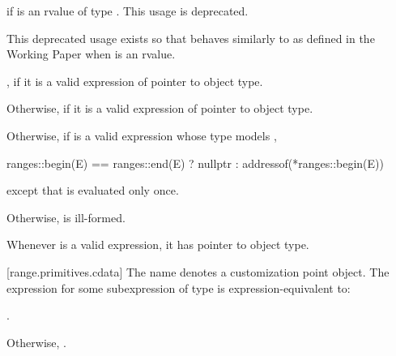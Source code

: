 {\begin{itemize}
{\color{oldclr}
\item
   if  is an rvalue of
  type . This usage is deprecated.
  \begin{note}
  This deprecated usage exists so that  behaves
  similarly to  as defined in the \Cpp Working
  Paper when  is an rvalue.
  \end{note}
} %

\item
   ,
   if it is a valid expression of pointer to object type.

\item
  Otherwise,  if it is a valid expression of pointer to object type.

\item
  Otherwise, if  is a valid expression whose type models
  ,
  \begin{codeblock}
  ranges::begin(E) == ranges::end(E) ? nullptr : addressof(*ranges::begin(E))
  \end{codeblock}
  except that  is evaluated only once.

\item
  Otherwise,  is ill-formed.
\end{itemize}

\pnum
\begin{note}
Whenever  is a valid expression, it
has pointer to object type.
\end{note}

[range.primitives.cdata]{}
\pnum
The name  denotes a customization point
object. The expression
 for some subexpression  of type 
is expression-equivalent to:
\begin{itemize}
\item {} .

{\color{newclr}
\item Otherwise, .
} %
\end{itemize}

}
